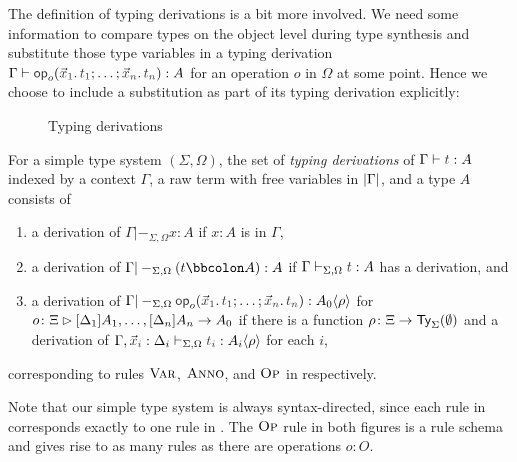 The definition of typing derivations is a bit more involved.
We need some information to compare types on the object level during type synthesis and substitute those type variables in a typing derivation $\Gamma \vdash \tmOpts : A$ for an operation $o$ in $\Omega$ at some point.
Hence we choose to include a substitution as part of its typing derivation explicitly:
\begin{definition}\label{def:typing-derivations}
  \begin{figure}
    \centering
    \small
    \caption{Typing derivations}
    \label{fig:extrinsic-typing}
  \end{figure}
  For a simple type system $(\Sigma, \Omega)$, the set of \emph{typing derivations} of $\Gamma \vdash \isTerm{t} : A$ indexed by a context $\Gamma$, a raw term with free variables in $\left|\Gamma\right|$, and a type $A$ consists of 
  \begin{enumerate}
    \item a derivation of $\Gamma |-_{\Sigma, \Omega} x : A$ if $x : A$ is in $\Gamma$,
    \item a derivation of $\Gamma |-_{\Sigma, \Omega} (t \annotate A) : A$ if $\Gamma \vdash_{\Sigma, \Omega} \isTerm{t} : A$ has a derivation, and
    \item a derivation of $\Gamma |-_{\Sigma, \Omega} \tmOpts : \simsub{A_0}{\rho}$ for $o\colon \Xi \rhd [\Delta_1]A_1, \ldots, [\Delta_{n}]A_{n} \to A_0$ if there is a function $\rho\colon \Xi \to \mathsf{Ty}_{\Sigma}(\emptyset)$ and a derivation of $\Gamma, \vars{x}_{\isTerm{i}} : \Delta_i \vdash_{\Sigma, \Omega} \isTerm{t_i} : \simsub{A_i}{\rho}$ for each $i$,
  \end{enumerate}
  corresponding to rules $\textnormal{\textsc{Var}}$, $\textnormal{\textsc{Anno}}$, and $\textnormal{\textsc{Op}}$ in  respectively.
\end{definition}
Note that our simple type system is always syntax-directed, since each rule in  corresponds exactly to one rule in . 
The $\textnormal{\textsc{Op}}$ rule in both figures is a rule schema and gives rise to as many rules as there are operations $o : O$.

